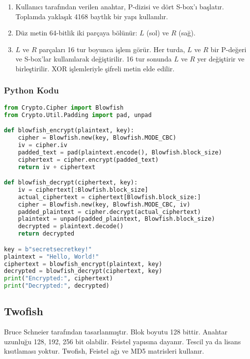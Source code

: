 \begin{enumerate}
    \item Kullanıcı tarafından verilen anahtar, P-dizisi ve dört S-box'ı başlatır. Toplamda yaklaşık 4168 baytlık bir yapı kullanılır.
    \item Düz metin 64-bitlik iki parçaya bölünür: $L$ (sol) ve $R$ (sağ).
    \item $L$ ve $R$ parçaları 16 tur boyunca işlem görür. Her turda, $L$ ve $R$ bir P-değeri ve S-box'lar kullanılarak değiştirilir. 16 tur sonunda $L$ ve $R$ yer değiştirir ve birleştirilir. XOR işlemleriyle şifreli metin elde edilir.
\end{enumerate}

\subsubsection{Python Kodu}

\begin{lstlisting}[language=Python]
from Crypto.Cipher import Blowfish
from Crypto.Util.Padding import pad, unpad

def blowfish_encrypt(plaintext, key):
    cipher = Blowfish.new(key, Blowfish.MODE_CBC)
    iv = cipher.iv
    padded_text = pad(plaintext.encode(), Blowfish.block_size)
    ciphertext = cipher.encrypt(padded_text)
    return iv + ciphertext

def blowfish_decrypt(ciphertext, key):
    iv = ciphertext[:Blowfish.block_size]
    actual_ciphertext = ciphertext[Blowfish.block_size:]
    cipher = Blowfish.new(key, Blowfish.MODE_CBC, iv)
    padded_plaintext = cipher.decrypt(actual_ciphertext)
    plaintext = unpad(padded_plaintext, Blowfish.block_size)
    decrypted = plaintext.decode()
    return decrypted

key = b"secretsecretkey!"
plaintext = "Hello, World!"
ciphertext = blowfish_encrypt(plaintext, key)
decrypted = blowfish_decrypt(ciphertext, key)
print("Encrypted:", ciphertext)
print("Decrypted:", decrypted)
\end{lstlisting}

\newpage

\subsection{Twofish}

Bruce Schneier tarafından tasarlanmıştır. Blok boyutu 128 bittir. Anahtar uzunluğu 128, 192, 256 bit olabilir. Feistel yapısına dayanır. Tescil ya da lisans kısıtlaması yoktur. Twofish, Feistel ağı ve MD5 matrisleri kullanır.


